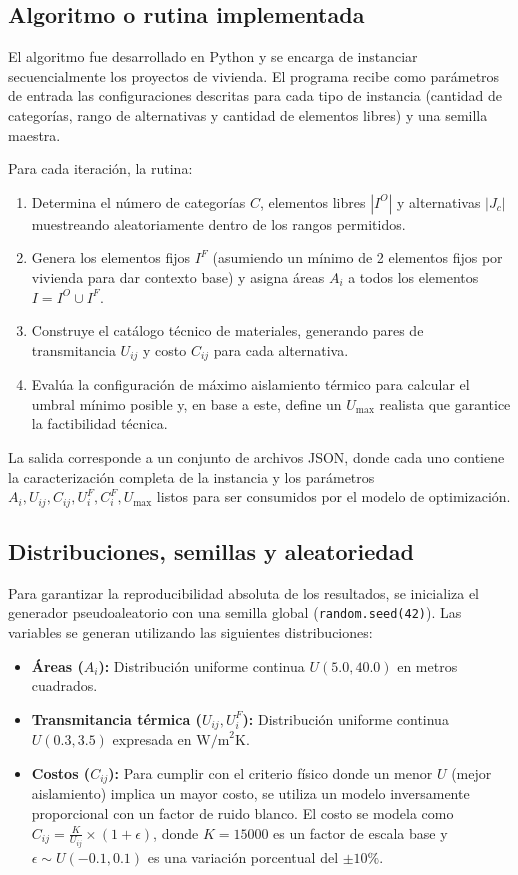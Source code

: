 \documentclass[journal, 12pt, onecolumn]{IEEEtran}
\begin{document}
\subsection{Algoritmo o rutina implementada}
El algoritmo fue desarrollado en Python y se encarga de instanciar secuencialmente los proyectos de vivienda. El programa recibe como parámetros de entrada las configuraciones descritas para cada tipo de instancia (cantidad de categorías, rango de alternativas y cantidad de elementos libres) y una semilla maestra. 

Para cada iteración, la rutina:
\begin{enumerate}
    \item Determina el número de categorías $C$, elementos libres $|I^O|$ y alternativas $|J_c|$ muestreando aleatoriamente dentro de los rangos permitidos.
    \item Genera los elementos fijos $I^F$ (asumiendo un mínimo de 2 elementos fijos por vivienda para dar contexto base) y asigna áreas $A_i$ a todos los elementos $I = I^O \cup I^F$.
    \item Construye el catálogo técnico de materiales, generando pares de transmitancia $U_{ij}$ y costo $C_{ij}$ para cada alternativa.
    \item Evalúa la configuración de máximo aislamiento térmico para calcular el umbral mínimo posible y, en base a este, define un $U_{\max}$ realista que garantice la factibilidad técnica.
\end{enumerate}
La salida corresponde a un conjunto de archivos JSON, donde cada uno contiene la caracterización completa de la instancia y los parámetros $A_i, U_{ij}, C_{ij}, U_i^F, C_i^F, U_{\max}$ listos para ser consumidos por el modelo de optimización.

\subsection{Distribuciones, semillas y aleatoriedad}
Para garantizar la reproducibilidad absoluta de los resultados, se inicializa el generador pseudoaleatorio con una semilla global (\texttt{random.seed(42)}). Las variables se generan utilizando las siguientes distribuciones:
\begin{itemize}
    \item \textbf{Áreas ($A_i$):} Distribución uniforme continua $U(5.0, 40.0)$ en metros cuadrados.
    \item \textbf{Transmitancia térmica ($U_{ij}, U_i^F$):} Distribución uniforme continua $U(0.3, 3.5)$ expresada en $\text{W/m}^2\text{K}$.
    \item \textbf{Costos ($C_{ij}$):} Para cumplir con el criterio físico donde un menor $U$ (mejor aislamiento) implica un mayor costo, se utiliza un modelo inversamente proporcional con un factor de ruido blanco. El costo se modela como $C_{ij} = \frac{K}{U_{ij}} \times (1 + \epsilon)$, donde $K=15000$ es un factor de escala base y $\epsilon \sim U(-0.1, 0.1)$ es una variación porcentual del $\pm 10\%$.
\end{itemize}
\end{document}
